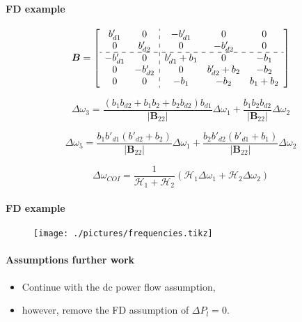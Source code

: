 \begin{frame}{\secname}
	\framesubtitle{FD example}
\begin{equation}
		\boldsymbol{B}=
		\left[
		\begin{array}{cc:ccc}
				b'_{d1} & 0 & -b'_{d1} & 0 & 0  \\
				0 & b'_{d2} & 0 & -b'_{d2} & 0 \\
			\hdashline
			-b'_{d1} & 0 & b'_{d1}+b_1 & 0 & -b_1 \\
			0 & -b'_{d2} & 0 & b'_{d2}+b_2 & -b_2 \\
			0 & 0 & -b_{1} & -b_{2} & b_{1}+b_2 \\
		\end{array}
		\right]
\end{equation}

\begin{equation}
		\Delta \omega_3 = \frac{(b_1b_{d2}+b_1b_2+b_2b_{d2})b_{d1}}{|\boldsymbol{B}_{22}|}\Delta\omega_1 +\frac{b_1b_2b_{d2}}{|\boldsymbol{B}_{22}|}\Delta\omega_2
\end{equation}

\begin{equation}
		\Delta \omega_5 = \frac{b_1b'_{d1}(b'_{d2}+b_2)}{|\boldsymbol{B}_{22}|}\Delta \omega_1 + \frac{b_2b'_{d2}(b'_{d1}+b_1)}{|\boldsymbol{B}_{22}|}\Delta \omega_2
\end{equation}

\begin{equation}
		\Delta \omega_{COI} = \frac{1}{\mathcal{H}_1+\mathcal{H}_2}(\mathcal{H}_1\Delta \omega_1 + \mathcal{H}_2\Delta \omega_2)
\end{equation}

\end{frame}

\begin{frame}{\secname}
	\framesubtitle{FD example}
	\begin{figure}
		\texttt{[image: ./pictures/frequencies.tikz]}
	\end{figure}
\end{frame}
\begin{frame}{\secname}
	\framesubtitle{Assumptions further work}
	\begin{itemize}
		\item<1-> Continue with the dc power flow assumption,
		\item<2-> however, remove the FD assumption of $\Delta P_l=0$.
	\end{itemize}
\end{frame}
